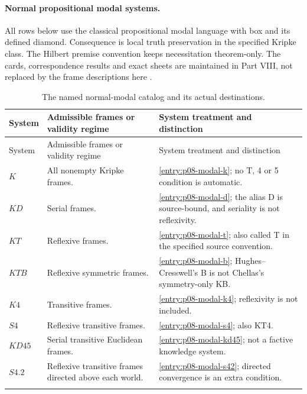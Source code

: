 \paragraph{Normal propositional modal systems.}
\label{entry:p14-directory-normal-modal}
All rows below use the classical propositional modal language with box
and its defined diamond. Consequence is local truth preservation in the
specified Kripke class. The Hilbert premise convention keeps necessitation
theorem-only. The cards, correspondence results and exact sheets are
maintained in Part VIII, not replaced by the frame descriptions here
\cite{Chellas1980,HughesCresswell1996,BlackburnDeRijkeVenema2001,
ChagrovZakharyaschev1997}.

\begin{longtable}{@{}p{}p{}p{}@{}}
\caption{The named normal-modal catalog and its actual destinations.}
\label{tab:p14-directory-normal-modal}\\
\toprule
System & Admissible frames or validity regime & System treatment and distinction\\
\midrule
\endfirsthead
\toprule
System & Admissible frames or validity regime & System treatment and distinction\\
\midrule
\endhead
\bottomrule
\endfoot
\(K\) & All nonempty Kripke frames. & \cref{entry:p08-modal-k}; no T,
4 or 5 condition is automatic.\\\addlinespace
\(KD\) & Serial frames. & \cref{entry:p08-modal-d}; the alias D is
source-bound, and seriality is not reflexivity.\\\addlinespace
\(KT\) & Reflexive frames. & \cref{entry:p08-modal-t}; also called T
in the specified source convention.\\\addlinespace
\(KTB\) & Reflexive symmetric frames. & \cref{entry:p08-modal-b};
Hughes--Cresswell's B is not Chellas's symmetry-only KB.\\\addlinespace
\(K4\) & Transitive frames. & \cref{entry:p08-modal-k4}; reflexivity
is not included.\\\addlinespace
\(S4\) & Reflexive transitive frames. & \cref{entry:p08-modal-s4};
also KT4.\\\addlinespace
\(KD45\) & Serial transitive Euclidean frames. &
\cref{entry:p08-modal-kd45}; not a factive knowledge system.\\\addlinespace
\(S4.2\) & Reflexive transitive frames directed above each world. &
\cref{entry:p08-modal-s42}; directed convergence is an extra condition.\\\addlinespace

\end{longtable}
